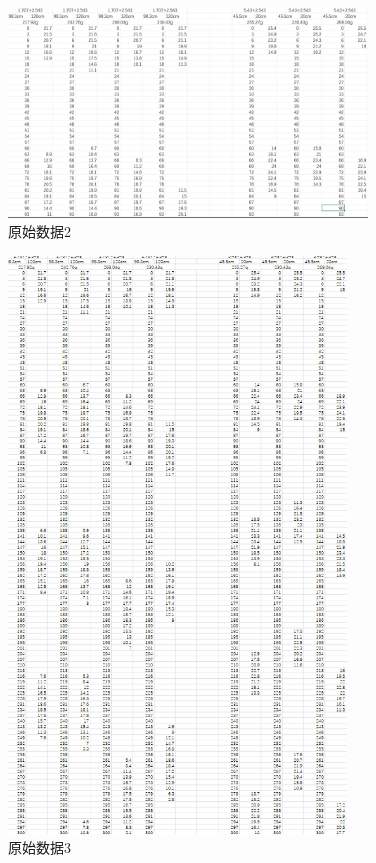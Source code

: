 \documentclass{ctexart}
\begin{document}
\begin{figure}[H]
  \centering
  \includegraphics[width=0.85\textwidth,height=0.6\textheight]{shujvchuli2.png}
  \caption{原始数据2}
\end{figure}
\newpage
\begin{figure}[H]
  \centering
  \includegraphics[width=0.8\textwidth,height=0.9\textheight]{shujvchuli3.png}
  \caption{原始数据3}
\end{figure}
\end{document}
